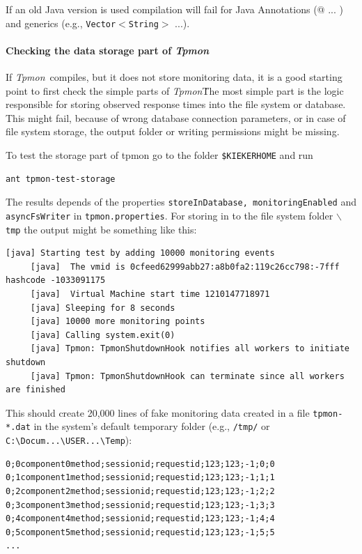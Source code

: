 \documentclass[a4paper,12pt]{scrartcl}
\newcommand{\tpmon}{\textit{Tpmon}}
\begin{document}
If an old Java version is used compilation will fail for Java Annotations (@ ... ) and generics (e.g., \texttt{Vector$<$String$>$} ...).


\paragraph{Checking the data storage part of \tpmon}
If \tpmon\ compiles, but it does not store monitoring data, it is a good
starting point to first check the simple parts of \tpmon\. The most simple
part is the logic responsible for storing observed response times into
the file system or database. This might fail, because of wrong 
database connection parameters, or in case of file system storage, 
the output folder or writing permissions might be missing.

To test the storage part of tpmon go to the folder \texttt{\$KIEKERHOME} and run
\begin{lstlisting}[caption={Testing the storage functionality},label={lst3}]
ant tpmon-test-storage
\end{lstlisting}

The results depends of the properties \texttt{storeInDatabase, monitoringEnabled} and \texttt{asyncFsWriter} in \texttt{tpmon.properties}. For storing in to the file system folder \texttt{$\backslash$tmp} the output might be something like this:

\begin{lstlisting}[caption={Output example for storage test},label={lst4}]
 [java] Starting test by adding 10000 monitoring events
     [java]  The vmid is 0cfeed62999abb27:a8b0fa2:119c26cc798:-7fff hashcode -1033091175
     [java]  Virtual Machine start time 1210147718971
     [java] Sleeping for 8 seconds
     [java] 10000 more monitoring points
     [java] Calling system.exit(0)
     [java] Tpmon: TpmonShutdownHook notifies all workers to initiate shutdown
     [java] Tpmon: TpmonShutdownHook can terminate since all workers are finished
\end{lstlisting}

This should create 20,000 lines of fake monitoring data created in a file \texttt{tpmon-*.dat} in the system's default temporary folder (e.g., \texttt{/tmp/} or \verb=C:\Docum...\USER...\Temp=):
\begin{lstlisting}[caption={Example fake monitoring data produced by the storage test},label={lst5}]
0;0component0method;sessionid;requestid;123;123;-1;0;0
0;1component1method;sessionid;requestid;123;123;-1;1;1
0;2component2method;sessionid;requestid;123;123;-1;2;2
0;3component3method;sessionid;requestid;123;123;-1;3;3
0;4component4method;sessionid;requestid;123;123;-1;4;4
0;5component5method;sessionid;requestid;123;123;-1;5;5
...
\end{lstlisting}
\end{document}
